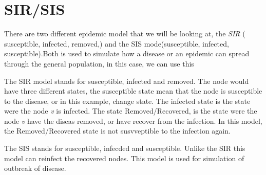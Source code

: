 \section{SIR/SIS}
There are two different epidemic model that we will be looking at, the {\it SIR} ( susceptible, infected, removed,) and the SIS mode(susceptible, infected, susceptible).Both is used to simulate how a disease or an epidemic can spread through the general population, in this case, we can use this 

The SIR model stands for susceptible, infected and removed. The node would have three different states, the susceptible state mean that the node is susceptible to the disease, or in this example, change state. The infected state is the state were the node {\it v} is infected. The state Removed/Recovered, is the state were the node {\it v} have the diseas removed, or have recover from the infection. In this model, the Removed/Recovered state is not susvveptible to the infection again. 

The SIS stands for susceptible, infecded and susceptible. Unlike the SIR this model can reinfect the recovered nodes. This model is used for simulation of outbreak of disease. 